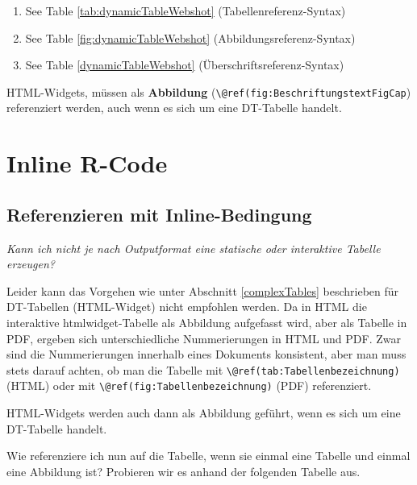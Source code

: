 \documentclass[]{book}
\providecommand{\tightlist}{%
  \setlength{\itemsep}{0pt}\setlength{\parskip}{0pt}}
\theoremstyle{definition}
\theoremstyle{definition}
\theoremstyle{remark}
\let\BeginKnitrBlock\begin \let\EndKnitrBlock\end
\begin{document}
\begin{enumerate}
\def\labelenumi{\arabic{enumi}.}
\tightlist
\item
  See Table \ref{tab:dynamicTableWebshot} (Tabellenreferenz-Syntax)
\item
  See Table \ref{fig:dynamicTableWebshot} (Abbildungsreferenz-Syntax)
\item
  See Table \ref{dynamicTableWebshot} (Überschriftsreferenz-Syntax)
\end{enumerate}

\BeginKnitrBlock{rmdcaution}
HTML-Widgets, müssen als \textbf{Abbildung}
(\texttt{\textbackslash{}@ref(fig:BeschriftungstextFigCap}) referenziert
werden, auch wenn es sich um eine DT-Tabelle handelt.
\EndKnitrBlock{rmdcaution}

\section{Inline R-Code}\label{inline-r-code}

\subsection{Referenzieren mit
Inline-Bedingung}\label{referenzieren-mit-inline-bedingung}

\emph{Kann ich nicht je nach Outputformat eine statische oder
interaktive Tabelle erzeugen?}

Leider kann das Vorgehen wie unter Abschnitt \ref{complexTables}
beschrieben für DT-Tabellen (HTML-Widget) nicht empfohlen werden. Da in
HTML die interaktive htmlwidget-Tabelle als Abbildung aufgefasst wird,
aber als Tabelle in PDF, ergeben sich unterschiedliche Nummerierungen in
HTML und PDF. Zwar sind die Nummerierungen innerhalb eines Dokuments
konsistent, aber man muss stets darauf achten, ob man die Tabelle mit
\texttt{\textbackslash{}@ref(tab:Tabellenbezeichnung)} (HTML) oder mit
\texttt{\textbackslash{}@ref(fig:Tabellenbezeichnung)} (PDF)
referenziert.

\BeginKnitrBlock{rmdimportant}
HTML-Widgets werden auch dann als Abbildung geführt, wenn es sich um
eine DT-Tabelle handelt.
\EndKnitrBlock{rmdimportant}

Wie referenziere ich nun auf die Tabelle, wenn sie einmal eine Tabelle
und einmal eine Abbildung ist? Probieren wir es anhand der folgenden
Tabelle aus.
\end{document}
